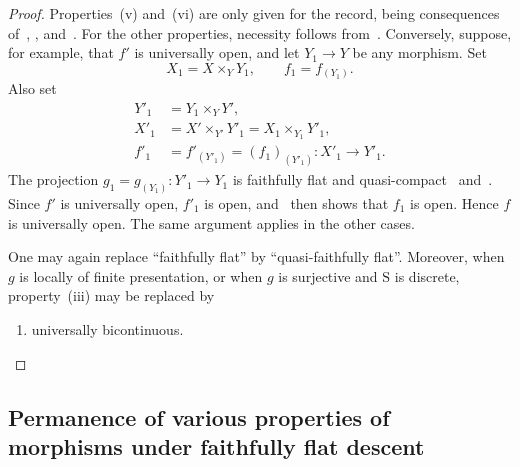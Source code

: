 \begin{proof}
Properties~(v) and~(vi) are only given for the record, being consequences
of~, , and~. For the
other properties, necessity follows from~. Conversely,
suppose, for example, that $f'$ is universally open, and let
$Y_1\to Y$ be any morphism. Set
\[
  X_1=X\times_Y Y_1,\qquad f_1=f_{(Y_1)}.
\]
Also set
\[
\begin{aligned}
  Y'_1&=Y_1\times_Y Y',\\
  X'_1&=X'\times_{Y'}Y'_1=X_1\times_{Y_1}Y'_1,\\
  f'_1&=f'_{(Y'_1)}=(f_1)_{(Y'_1)}:X'_1\to Y'_1.
\end{aligned}
\]
The projection $g_1=g_{(Y_1)}:Y'_1\to Y_1$ is faithfully flat and
quasi-compact~ and~. Since $f'$ is
universally open, $f'_1$ is open, and~ then shows that
$f_1$ is open. Hence $f$ is universally open. The same argument applies
in the other cases.

One may again replace ``faithfully flat'' by ``quasi-faithfully flat''.
Moreover, when $g$ is locally of finite presentation, or when $g$ is
surjective and $\mathrm{S}$ is discrete, property~(iii) may be replaced
by
\begin{enumerate}
  \item[(iii \emph{bis})] universally bicontinuous.
\end{enumerate}
\end{proof}


\subsection{Permanence of various properties of morphisms under faithfully flat descent}
\label{subsection:IV.2.7}

